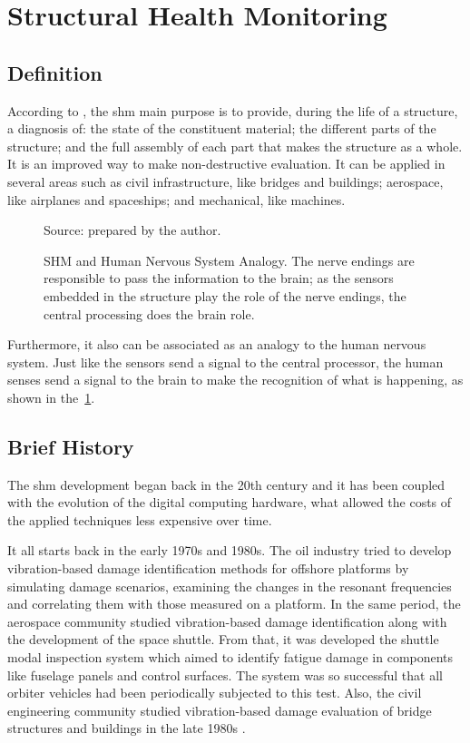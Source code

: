 \section{Structural Health Monitoring}

\subsection{Definition}

According to  \citet{balageas2010}, the \gls*{shm} main purpose is to provide, during the life of a structure,  a diagnosis of: the state of the constituent material; the different parts of the structure; and the full assembly of each part that makes the structure as a whole. 
It is an improved way to make non-destructive evaluation.
It can be applied in several areas such as civil infrastructure, like bridges and buildings; aerospace, like airplanes and spaceships; and mechanical, like machines.
%
\begin{figure}[!htb]
    \centering
    \caption[SHM and Human Nervous System Analogy]{SHM and Human Nervous System Analogy. The nerve endings are responsible to pass the information to the brain; as the sensors embedded in the structure play the role of the nerve endings, the central processing does the brain role.}
    
    
    {\footnotesize Source: prepared by the author.}
    \label{fig:shm_nervous_system}
\end{figure}

Furthermore, it also can be associated as an analogy to the human nervous system. 
Just like the sensors send a signal to the central processor, the human senses send a signal to the brain to make the recognition of what is happening, as shown in the~\cref{fig:shm_nervous_system}.

\subsection{Brief History}

The \gls*{shm} development began back in the 20th century and it has been coupled with the evolution of the digital computing hardware, what allowed the costs of the applied techniques less expensive over time.

It all starts back in the early 1970s and 1980s. 
The oil industry tried to develop vibration-based damage identification methods for offshore platforms by simulating damage scenarios, examining the changes in the resonant frequencies and correlating them with those measured on a platform.
In the same period, the aerospace community studied vibration-based damage identification along with the development of the space shuttle. 
From that, it was developed the shuttle modal inspection system which aimed to identify fatigue damage in components like fuselage panels and control surfaces. The system was so successful that all orbiter vehicles had been periodically subjected to this test.
Also, the civil engineering community studied vibration-based damage evaluation of bridge structures and buildings in the late 1980s \citep{farrar2007}.

